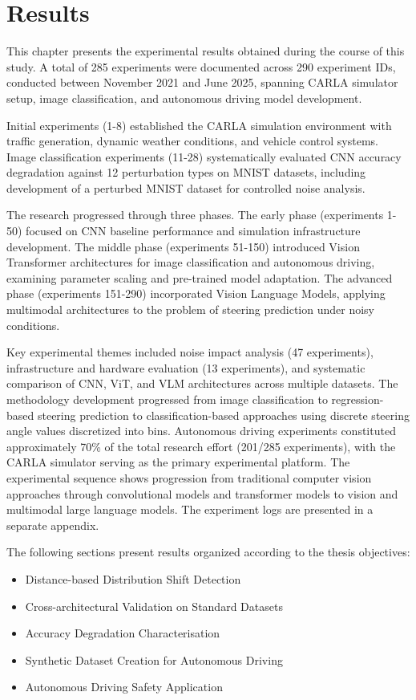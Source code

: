 \chapter{Results}
\label{chap:results}

This chapter presents the experimental results obtained during the course of this study. A total of 285 experiments were documented across 290 experiment IDs, conducted between November 2021 and June 2025, spanning CARLA simulator setup, image classification, and autonomous driving model development.

Initial experiments (1-8) established the CARLA simulation environment with traffic generation, dynamic weather conditions, and vehicle control systems. Image classification experiments (11-28) systematically evaluated CNN accuracy degradation against 12 perturbation types on MNIST datasets, including development of a perturbed MNIST dataset for controlled noise analysis.

The research progressed through three phases. The early phase (experiments 1-50) focused on CNN baseline performance and simulation infrastructure development. The middle phase (experiments 51-150) introduced Vision Transformer architectures for image classification and autonomous driving, examining parameter scaling and pre-trained model adaptation. The advanced phase (experiments 151-290) incorporated Vision Language Models, applying multimodal architectures to the problem of steering prediction under noisy conditions.

Key experimental themes included noise impact analysis (47 experiments), infrastructure and hardware evaluation (13 experiments), and systematic comparison of CNN, ViT, and VLM architectures across multiple datasets. The methodology development progressed from image classification to regression-based steering prediction to classification-based approaches using discrete steering angle values discretized into bins. Autonomous driving experiments constituted approximately 70\% of the total research effort (201/285 experiments), with the CARLA simulator serving as the primary experimental platform. The experimental sequence shows progression from traditional computer vision approaches through convolutional models and transformer models to vision and multimodal large language models. The experiment logs are presented in a separate appendix.

The following sections present results organized according to the thesis objectives:

\begin{itemize}

\item Distance-based Distribution Shift Detection
\item Cross-architectural Validation on Standard Datasets
\item Accuracy Degradation Characterisation
\item Synthetic Dataset Creation for Autonomous Driving
\item Autonomous Driving Safety Application
\end{itemize}
